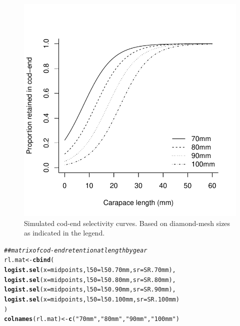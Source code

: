 \documentclass[12pt]{article}\usepackage[]{graphicx}\usepackage[]{color}
\makeatletter
\def\maxwidth{ %
  \ifdim\Gin@nat@width>\linewidth
    \linewidth
  \else
    \Gin@nat@width
  \fi
}
\newcommand{\hlstr}[1]{\textcolor[rgb]{0.192,0.494,0.8}{#1}}%
\newcommand{\hlcom}[1]{\textcolor[rgb]{0.678,0.584,0.686}{\textit{#1}}}%
\newcommand{\hlstd}[1]{\textcolor[rgb]{0.345,0.345,0.345}{#1}}%
\newcommand{\hlkwb}[1]{\textcolor[rgb]{0.69,0.353,0.396}{#1}}%
\newcommand{\hlkwc}[1]{\textcolor[rgb]{0.333,0.667,0.333}{#1}}%
\newcommand{\hlkwd}[1]{\textcolor[rgb]{0.737,0.353,0.396}{\textbf{#1}}}%
\newenvironment{kframe}{%
 \def\at@end@of@kframe{}%
 \ifinner\ifhmode%
  \def\at@end@of@kframe{\end{minipage}}%
  \begin{minipage}{\columnwidth}%
 \fi\fi%
 \def\FrameCommand##1{\hskip\@totalleftmargin \hskip-\fboxsep
 \colorbox{shadecolor}{##1}\hskip-\fboxsep
     \hskip-\linewidth \hskip-\@totalleftmargin \hskip\columnwidth}%
 \MakeFramed {\advance\hsize-\width
   \@totalleftmargin\z@ \linewidth\hsize
   \@setminipage}}%
 {\par\unskip\endMakeFramed%
 \at@end@of@kframe}
\newenvironment{knitrout}{}{} %
\makeatother
\begin{document}
\begin{knitrout}
\begin{figure}
{\centering \includegraphics[width=\maxwidth]{figure/codendsel-1} 

}

\caption[Simulated cod-end selectivity curves]{Simulated cod-end selectivity curves. Based on diamond-mesh sizes as indicated in the legend.}\label{fig:codendsel}
\end{figure}

\begin{kframe}\begin{alltt}
\hlcom{## matrix of cod-end retention at length by gear}
\hlstd{rl.mat} \hlkwb{<-} \hlkwd{cbind}\hlstd{(}
            \hlkwd{logist.sel}\hlstd{(}\hlkwc{x} \hlstd{= midpoints,} \hlkwc{l50} \hlstd{= l50.70mm,} \hlkwc{sr} \hlstd{= SR.70mm),}
            \hlkwd{logist.sel}\hlstd{(}\hlkwc{x} \hlstd{= midpoints,} \hlkwc{l50} \hlstd{= l50.80mm,} \hlkwc{sr} \hlstd{= SR.80mm),}
            \hlkwd{logist.sel}\hlstd{(}\hlkwc{x} \hlstd{= midpoints,} \hlkwc{l50} \hlstd{= l50.90mm,} \hlkwc{sr} \hlstd{= SR.90mm),}
            \hlkwd{logist.sel}\hlstd{(}\hlkwc{x} \hlstd{= midpoints,} \hlkwc{l50} \hlstd{= l50.100mm,} \hlkwc{sr} \hlstd{= SR.100mm)}
            \hlstd{)}
\hlkwd{colnames}\hlstd{(rl.mat)} \hlkwb{<-} \hlkwd{c}\hlstd{(}\hlstr{"70mm"}\hlstd{,} \hlstr{"80mm"}\hlstd{,} \hlstr{"90mm"}\hlstd{,} \hlstr{"100mm"}\hlstd{)}
\end{alltt}
\end{kframe}
\end{knitrout}
\end{document}
